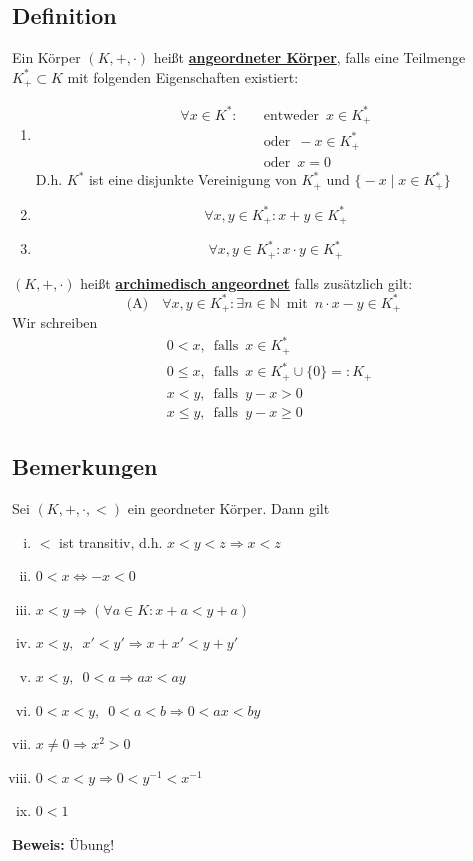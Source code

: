 \subsection{Definition}
Ein Körper \((K,+, \cdot )\) heißt \underline{\textbf{angeordneter Körper}}, falls eine Teilmenge \(K_{+}^* \subset K\) mit folgenden Eigenschaften existiert:
\begin{enumerate}[(01)]
\item 
\begin{align*}
\forall x \in K^* : \quad &\text{entweder} \enspace x \in K^*_+ \\
&\text{oder} \enspace -x \in K^*_+ \\
&\text{oder}\enspace  x=0
\end{align*}
D.h. \(K^*\) ist eine disjunkte Vereinigung von \(K^*_+\) und \( \big\{ -x \mid x \in K^*_+\big\} \)

\item \[ \forall x,y \in K^*_+ : x+y \in K^*_+\]
\item \[ \forall x,y \in K^*_+ : x \cdot y \in K^*_+\]
\end{enumerate}

\((K,+, \cdot )\) heißt \underline{\textbf{archimedisch angeordnet}} falls zusätzlich gilt:
\[
\text{(A)} \quad \forall x,y \in K^*_+ :  \exists n \in \mathds{N} \enspace \text{mit} \enspace n \cdot x - y \in K^*_+ 
\]
Wir schreiben 
\begin{align*}
&0 < x , \enspace \text{falls} \enspace x \in K^*_+ \\
&0 \leq x , \enspace \text{falls} \enspace x \in K^*_+ \cup \{0\} =: K_+ \\
&x < y , \enspace \text{falls} \enspace y-x > 0 \\
&x \leq y , \enspace \text{falls} \enspace y-x \geq 0 
\end{align*}

\subsection{Bemerkungen}
Sei \((K,+, \cdot, < )\) ein geordneter Körper. Dann gilt
\begin{enumerate}[(i)]
\item \(<\) ist transitiv, d.h. \(x<y<z \Rightarrow x<z\)
\item \( 0<x \Leftrightarrow -x<0\)
\item \( x<y \Rightarrow (\forall a \in K : x+a < y+a)\)
\item \( x<y, \enspace x'<y' \Longrightarrow x+x' < y+y'\)
\item \( x<y, \enspace 0<a \Longrightarrow ax < ay\)
\item \( 0<x<y, \enspace 0<a<b \Longrightarrow 0<ax<by\)
\item \( x \not= 0 \Longrightarrow x^2 > 0\)
\item \( 0<x<y \Longrightarrow 0<y^{-1}< x^{-1}\)
\item \( 0<1\)
\end{enumerate}
\textbf{Beweis:} Übung!

